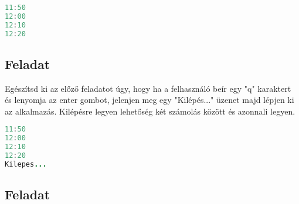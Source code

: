 \documentclass{article}
\begin{document}
\begin{lstlisting}[language=Java, caption=Kimenet]
11:50
12:00
12:10
12:20
\end{lstlisting}

\subsection{Feladat}

Egészítsd ki az előző feladatot úgy, hogy ha a felhasználó beír egy "q" karaktert és lenyomja az enter gombot, jelenjen meg egy "Kilépés..." üzenet majd lépjen ki az alkalmazás. Kilépésre legyen lehetőség két számolás között és azonnali legyen.

\begin{lstlisting}[language=Java, caption=Kimenet]
11:50
12:00
12:10
12:20
Kilepes...
\end{lstlisting}

\subsection{Feladat}
\end{document}
